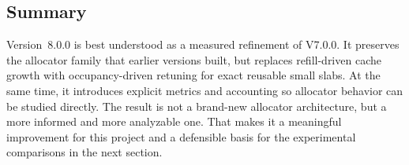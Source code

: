 \subsection{Summary}

Version~8.0.0 is best understood as a measured refinement of V7.0.0. It preserves the allocator family that
earlier versions built, but replaces refill-driven cache growth with occupancy-driven retuning for exact
reusable small slabs. At the same time, it introduces explicit metrics and accounting so allocator behavior
can be studied directly. The result is not a brand-new allocator architecture, but a more informed and more
analyzable one. That makes it a meaningful improvement for this project and a defensible basis for the
experimental comparisons in the next section.
